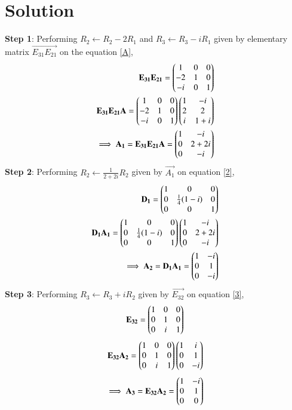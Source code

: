 \documentclass[journal,12pt,twocolumn]{IEEEtran}
\begin{document}
\section{Solution}
\textbf{Step 1}: Performing $R_2 \leftarrow R_2-2R_1$ and $R_3 \leftarrow R_3-iR_1$ given by elementary matrix $\vec{E_{31}E_{21}}$ on the equation \eqref{A},
\begin{align}
\mathbf{E_{31}E_{21}} = \begin{pmatrix}1&0&0\\-2&1&0\\-i&0&1\end{pmatrix}\\
\mathbf{E_{31}E_{21}A} =   \begin{pmatrix}1&0&0\\-2&1&0\\-i&0&1\end{pmatrix}\begin{pmatrix}1&-i\\2&2\\i& 1+i\end{pmatrix}\\
\implies\mathbf{A_1} = \mathbf{E_{31}E_{21}A} = \begin{pmatrix}1&-i\\0&2+2i\\0&-i\end{pmatrix}\label{2}
\end{align}
\textbf{Step 2}: Performing $R_2\leftarrow \frac{1}{2+2i}R_2$ given by $\vec{A_1}$ on equation \eqref{2},
\begin{align}
\mathbf{D_1} = \begin{pmatrix}1&0&0\\0&\frac{1}{4}(1-i)&0\\0&0&1\end{pmatrix}\\
\mathbf{D_1A_1} = \begin{pmatrix}1&0&0\\0&\frac{1}{4}(1-i)&0\\0&0&1\end{pmatrix}\begin{pmatrix}1&-i\\0&2+2i\\0&-i\end{pmatrix}\\
\implies \mathbf{A_2}=\mathbf{D_1A_1} = \begin{pmatrix}1&-i\\0&1\\0&-i\end{pmatrix}\label{3}
\end{align}
\textbf{Step 3}: Performing $R_3\leftarrow R_3+iR_2$ given by $\vec{E_{32}}$ on equation \eqref{3},
\begin{align}
\mathbf{E_{32}} = \begin{pmatrix}1&0&0\\0&1&0\\0&i&1\end{pmatrix}
\end{align}
\begin{align}
\mathbf{E_{32}A_2} = \begin{pmatrix}1&0&0\\0&1&0\\0&i&1\end{pmatrix}\begin{pmatrix}1&i\\0&1\\0&-i\end{pmatrix}
\end{align}
\begin{align}
\implies \mathbf{A_3}=\mathbf{E_{32}A_2} = \begin{pmatrix}1&-i\\0&1\\0&0\end{pmatrix}\label{4}
\end{align}
\end{document}
